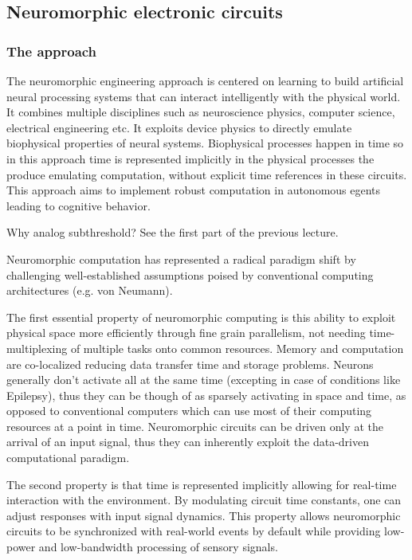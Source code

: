 \documentclass[main]{subfiles}
\begin{document}
\subsection{Neuromorphic electronic circuits}

\subsubsection{The approach}
The neuromorphic engineering approach is centered on learning to build artificial neural processing systems that can interact intelligently with the physical world. It combines multiple disciplines such as neuroscience physics, computer science, electrical engineering etc. It exploits device physics to directly emulate biophysical properties of neural systems. Biophysical processes happen in time so in this approach time is represented implicitly in the physical processes the produce emulating computation, without explicit time references in these circuits. This approach aims to implement robust computation in autonomous egents leading to cognitive behavior.

Why analog subthreshold? See the first part of the previous lecture.

Neuromorphic computation has represented a radical paradigm shift by challenging well-established assumptions poised by conventional computing architectures (e.g. von Neumann). 

The first essential property of neuromorphic computing is this ability to exploit physical space more efficiently through fine grain parallelism, not needing time-multiplexing of multiple tasks onto common resources. Memory and computation are co-localized reducing data transfer time and storage problems. Neurons generally don't activate all at the same time (excepting in case of conditions like Epilepsy), thus they can be though of as sparsely activating in space and time, as opposed to conventional computers which can use most of their computing resources at a point in time. Neuromorphic circuits can be driven only at the arrival of an input signal, thus they can inherently exploit the data-driven computational paradigm.

The second property is that time is represented implicitly allowing for real-time interaction with the environment. By modulating circuit time constants, one can adjust responses with input signal dynamics. This property allows neuromorphic circuits to be synchronized with real-world events by default while providing low-power and low-bandwidth processing of sensory signals.
\end{document}
